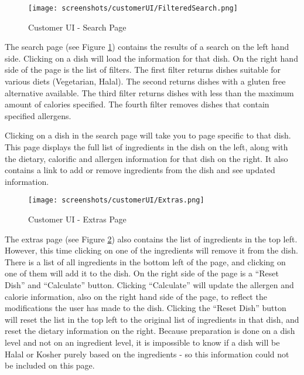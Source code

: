 \begin{figure}[h]
    \centering
    \captionsetup{justification=centering}
    \texttt{[image: screenshots/customerUI/FilteredSearch.png]}
    \caption{Customer UI - Search Page}
    \label{fig:customerUI_search}
\end{figure}

The search page (see Figure \ref{fig:customerUI_search}) contains the results of a search on the left hand side. Clicking on a dish will load the information for that dish. On the right hand side of the page is the list of filters. The first filter returns dishes suitable for various diets (Vegetarian, Halal). The second returns dishes with a gluten free alternative available. The third filter returns dishes with less than the maximum amount of calories specified. The fourth filter removes dishes that contain specified allergens.

Clicking on a dish in the search page will take you to page specific to that dish. This page displays the full list of ingredients in the dish on the left, along with the dietary, calorific and allergen information for that dish on the right. It also contains a link to add or remove ingredients from the dish and see updated information.

\begin{figure}[h]
    \centering
    \captionsetup{justification=centering}
    \texttt{[image: screenshots/customerUI/Extras.png]}
    \caption{Customer UI - Extras Page}
    \label{fig:customerUI_extras}
\end{figure}

The extras page (see Figure \ref{fig:customerUI_extras}) also contains the list of ingredients in the top left. However, this time clicking on one of the ingredients will remove it from the dish. There is a list of all ingredients in the bottom left of the page, and clicking on one of them will add it to the dish. On the right side of the page is a ``Reset Dish'' and ``Calculate'' button. Clicking ``Calculate'' will update the allergen and calorie information, also on the right hand side of the page, to reflect the modifications the user has made to the dish. Clicking the ``Reset Dish'' button will reset the list in the top left to the original list of ingredients in that dish, and reset the dietary information on the right. Because preparation is done on a dish level and not on an ingredient level, it is impossible to know if a dish will be Halal or Kosher purely based on the ingredients - so this information could not be included on this page.

